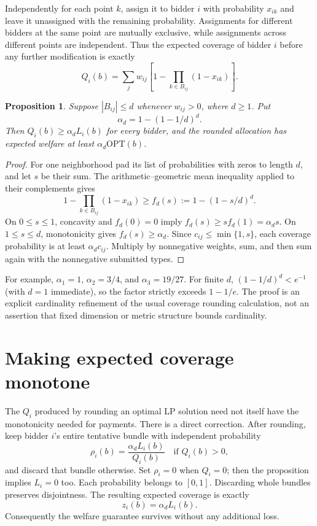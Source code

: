 \documentclass[11pt]{article}
\newtheorem{proposition}{Proposition}
\begin{document}
Independently for each point $k$, assign it to bidder $i$ with probability
$x_{ik}$ and leave it unassigned with the remaining probability. Assignments
for different bidders at the same point are mutually exclusive, while
assignments across different points are independent. Thus the expected
coverage of bidder $i$ before any further modification is exactly
\[
 Q_i(b)=\sum_j w_{ij}
       \left[1-\prod_{k\in B_{ij}}(1-x_{ik})\right].                \tag{2}
\]

\begin{proposition}
Suppose $|B_{ij}|\leq d$ whenever $w_{ij}>0$, where $d\geq1$. Put
\[
                 \alpha_d=1-(1-1/d)^d.
\]
Then $Q_i(b)\geq\alpha_d L_i(b)$ for every bidder, and the rounded
allocation has expected welfare at least $\alpha_d\mathrm{OPT}(b)$.
\end{proposition}
\begin{proof}
For one neighborhood pad its list of probabilities with zeros to length
$d$, and let $s$ be their sum. The arithmetic--geometric mean inequality
applied to their complements gives
\[
 1-\prod_{k\in B_{ij}}(1-x_{ik})
       \geq f_d(s):=1-(1-s/d)^d.
\]
On $0\leq s\leq1$, concavity and $f_d(0)=0$ imply
$f_d(s)\geq s f_d(1)=\alpha_d s$. On $1\leq s\leq d$, monotonicity gives
$f_d(s)\geq\alpha_d$. Since $c_{ij}\leq\min\{1,s\}$, each coverage
probability is at least $\alpha_d c_{ij}$. Multiply by nonnegative weights,
sum, and then sum again with the nonnegative submitted types.
\end{proof}

For example, $\alpha_1=1$, $\alpha_2=3/4$, and $\alpha_3=19/27$.
For finite $d$, $(1-1/d)^d<e^{-1}$ (with $d=1$ immediate), so the factor
strictly exceeds $1-1/e$. The proof is an explicit cardinality refinement
of the usual coverage rounding calculation, not an assertion that fixed
dimension or metric structure bounds cardinality.

\section*{Making expected coverage monotone}
The $Q_i$ produced by rounding an optimal LP solution need not itself have
the monotonicity needed for payments. There is a direct correction. After
rounding, keep bidder $i$'s entire tentative bundle with independent
probability
\[
 \rho_i(b)=\frac{\alpha_d L_i(b)}{Q_i(b)}
                         \quad\text{if }Q_i(b)>0,
\]
and discard that bundle otherwise. Set $\rho_i=0$ when $Q_i=0$; then the
proposition implies $L_i=0$ too. Each probability belongs to $[0,1]$.
Discarding whole bundles preserves disjointness. The resulting expected
coverage is exactly
\[
                         z_i(b)=\alpha_d L_i(b).                  \tag{3}
\]
Consequently the welfare guarantee survives without any additional loss.
\end{document}
